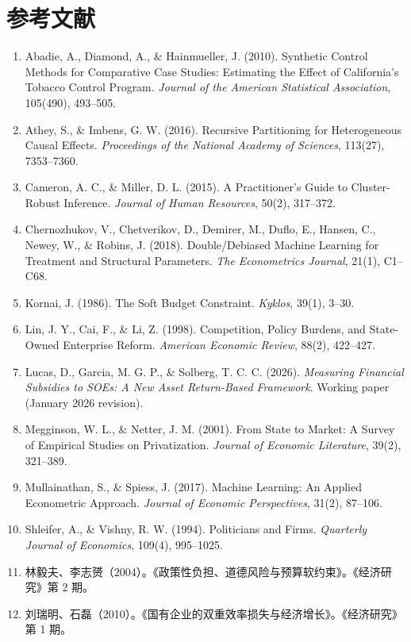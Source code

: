 \documentclass[11pt,a4paper]{ctexart}
\begin{document}
\section{参考文献}

\begin{enumerate}

  \item Abadie, A., Diamond, A., \& Hainmueller, J. (2010). Synthetic Control Methods for Comparative Case Studies: Estimating the Effect of California's Tobacco Control Program. \emph{Journal of the American Statistical Association}, 105(490), 493--505.

  \item Athey, S., \& Imbens, G. W. (2016). Recursive Partitioning for Heterogeneous Causal Effects. \emph{Proceedings of the National Academy of Sciences}, 113(27), 7353--7360.

  \item Cameron, A. C., \& Miller, D. L. (2015). A Practitioner's Guide to Cluster-Robust Inference. \emph{Journal of Human Resources}, 50(2), 317--372.

  \item Chernozhukov, V., Chetverikov, D., Demirer, M., Duflo, E., Hansen, C., Newey, W., \& Robins, J. (2018). Double/Debiased Machine Learning for Treatment and Structural Parameters. \emph{The Econometrics Journal}, 21(1), C1--C68.

  \item Kornai, J. (1986). The Soft Budget Constraint. \emph{Kyklos}, 39(1), 3--30.

  \item Lin, J. Y., Cai, F., \& Li, Z. (1998). Competition, Policy Burdens, and State-Owned Enterprise Reform. \emph{American Economic Review}, 88(2), 422--427.

  \item Lucas, D., Garcia, M. G. P., \& Solberg, T. C. C. (2026). \emph{Measuring Financial Subsidies to SOEs: A New Asset Return-Based Framework}. Working paper (January 2026 revision).

  \item Megginson, W. L., \& Netter, J. M. (2001). From State to Market: A Survey of Empirical Studies on Privatization. \emph{Journal of Economic Literature}, 39(2), 321--389.

  \item Mullainathan, S., \& Spiess, J. (2017). Machine Learning: An Applied Econometric Approach. \emph{Journal of Economic Perspectives}, 31(2), 87--106.

  \item Shleifer, A., \& Vishny, R. W. (1994). Politicians and Firms. \emph{Quarterly Journal of Economics}, 109(4), 995--1025.

  \item 林毅夫、李志赟（2004）。《政策性负担、道德风险与预算软约束》。《经济研究》第 2 期。

  \item 刘瑞明、石磊（2010）。《国有企业的双重效率损失与经济增长》。《经济研究》第 1 期。

\end{enumerate}
\end{document}
